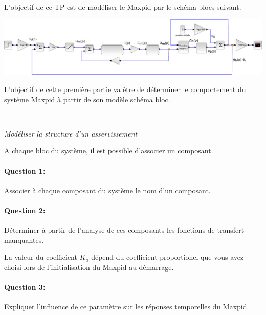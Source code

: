 

\ifdef{\public}{\cleardoublepage}{}



L'objectif de ce TP est de modéliser le Maxpid par le schéma blocs suivant.

\begin{center}
 \includegraphics[width=0.95\linewidth]{img/Maxpid}
\end{center}

L'objectif de cette première partie va être de déterminer le comportement du système Maxpid à partir de son modèle schéma bloc.

~\

\textit{Modéliser la structure d'un asservissement}

A chaque bloc du système, il est possible d'associer un composant.

\paragraph{Question 1:} Associer à chaque composant du système le nom d'un composant.

\paragraph{Question 2:} Déterminer à partir de l'analyse de ces composants les fonctions de transfert manquantes.

La valeur du coefficient $K_a$ dépend du coefficient proportionel que vous avez choisi lors de l'initialisation du Maxpid au démarrage.

\paragraph{Question 3:} Expliquer l'influence de ce paramètre sur les réponses temporelles du Maxpid.

\ifdef{\public}{\cleardoublepage}{}


